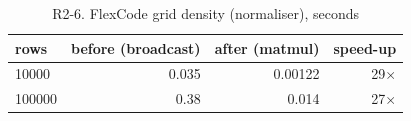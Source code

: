 \begin{table}[H]\centering\small
\caption{R2-6. FlexCode grid density (normaliser), seconds}\label{tab:r2flex}

\begin{tabular}{lrrr}\toprule
rows & before (broadcast) & after (matmul) & speed-up \\ \midrule
10000 & 0.035 & 0.00122 & 29$\times$ \\
100000 & 0.38 & 0.014 & 27$\times$ \\
\bottomrule\end{tabular}
\end{table}
